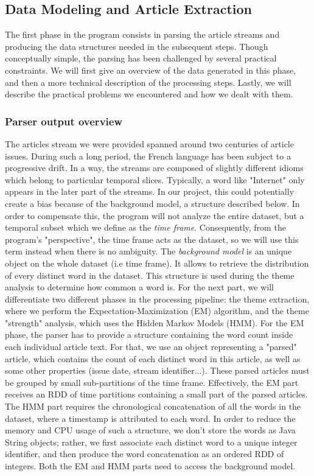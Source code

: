 \subsection{Data Modeling and Article Extraction}
The first phase in the program consists in parsing the article streams and producing the data structures needed in the subsequent steps. Though conceptually simple, the parsing has been challenged by several practical constraints. We will first give an overview of the data generated in this phase, and then a more technical description of the processing steps. Lastly, we will describe the practical problems we encountered and how we dealt with them.

\subsubsection{Parser output overview}
The articles stream we were provided spanned around two centuries of article issues. During such a long period, the French language has been subject to a progressive drift. In a way, the streams are composed of slightly different idioms which belong to particular temporal slices. Typically, a word like "Internet" only appears in the later part of the streams. In our project, this could potentially create a bias because of the background model, a structure described below. In order to compensate this, the program will not analyze the entire dataset, but a temporal subset which we define as the \emph{time frame}. Consequently, from the program's "perspective", the time frame acts as the dataset, so we will use this term instead when there is no ambiguity.
The \emph{background model} is an unique object on the whole dataset (i.e time frame). It allows to retrieve the distribution of every distinct word in the dataset. This structure is used during the theme analysis to determine how common a word is.
For the next part, we will differentiate two different phases in the processing pipeline: the theme extraction, where we perform the Expectation-Maximization (EM) algorithm, and the theme "strength" analysis, which uses the Hidden Markov Models (HMM). For the EM phase, the parser has to provide a structure containing the word count inside each individual article text. For that, we use an object representing a "parsed" article, which contains the count of each distinct word in this article, as well as some other properties (issue date, stream identifier...). These parsed articles must be grouped by small sub-partitions of the time frame. Effectively, the EM part receives an RDD of time partitions containing a small part of the parsed articles. The HMM part requires the chronological concatenation of all the words in the dataset, where a timestamp is attributed to each word. In order to reduce the memory and CPU usage of such a structure, we don't store the words as Java String objects; rather, we first associate each distinct word to a unique integer identifier, and then produce the word concatenation as an ordered RDD of integers. Both the EM and HMM parts need to access the background model.

